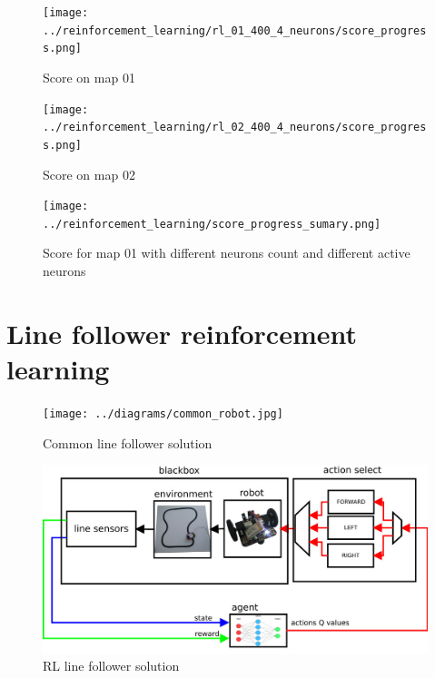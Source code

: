 \documentclass[10pt,a4paper]{article}
\begin{document}
\begin{figure}[ht]
  \centering
  \texttt{[image: ../reinforcement\_learning/rl\_01\_400\_4\_neurons/score\_progress.png]}
  \caption{Score on map 01}
  \label{fig:rl_01_map}
\end{figure}


\begin{figure}[ht]
  \centering
  \texttt{[image: ../reinforcement\_learning/rl\_02\_400\_4\_neurons/score\_progress.png]}
  \caption{Score on map 02}
  \label{fig:rl_02_map}
\end{figure}


\begin{figure}[ht]
  \centering
  \texttt{[image: ../reinforcement\_learning/score\_progress\_sumary.png]}
  \caption{Score for map 01 with different neurons count and different active neurons}
  \label{fig:rl_summary}
\end{figure}

\newpage
\section{Line follower reinforcement learning}



\begin{figure}[ht]
\centering
\begin{minipage}[b]{.6\textwidth}
\hspace*{-4cm}
  \centering
  \texttt{[image: ../diagrams/common\_robot.jpg]}
  \caption{Common line follower solution}
  \label{fig:Common_line_follower_solution}

\end{minipage} %
\begin{minipage}[b]{.3\textwidth}
\hspace*{-2cm}
\centering
 \includegraphics[scale=0.2]{../diagrams/rl_robot.jpg}
 \caption{RL line follower solution}
 \label{fig:RL_line_follower_solution}

\end{minipage}
\end{figure}
\end{document}
